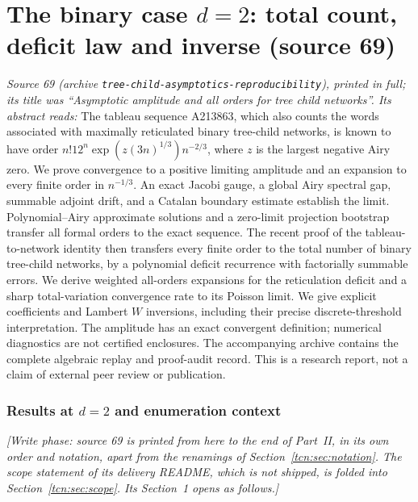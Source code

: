 \documentclass[11pt,letterpaper]{article}
\theoremstyle{remark}
\begin{document}
\part{The binary case \texorpdfstring{$d=2$}{d = 2}: total count, deficit law and inverse (source 69)}\label{tcn:part:b}
\emph{Source 69 (archive \textup{\nolinkurl{tree-child-asymptotics-reproducibility}}), printed in full; its title was ``Asymptotic amplitude and all orders for tree child networks''. Its abstract reads:} The tableau sequence A213863, which also counts the words associated with maximally reticulated binary tree-child networks, is known to have order $n!12^n\exp(z(3n)^{1/3})n^{-2/3}$, where $z$ is the largest negative Airy zero. We prove convergence to a positive limiting amplitude and an expansion to every finite order in $n^{-1/3}$. An exact Jacobi gauge, a global Airy spectral gap, summable adjoint drift, and a Catalan boundary estimate establish the limit. Polynomial--Airy approximate solutions and a zero-limit projection bootstrap transfer all formal orders to the exact sequence. The recent proof of the tableau-to-network identity then transfers every finite order to the total number of binary tree-child networks, by a polynomial deficit recurrence with factorially summable errors. We derive weighted all-orders expansions for the reticulation deficit and a sharp total-variation convergence rate to its Poisson limit. We give explicit coefficients and Lambert $W$ inversions, including their precise discrete-threshold interpretation. The amplitude has an exact convergent definition; numerical diagnostics are not certified enclosures. The accompanying archive contains the complete algebraic replay and proof-audit record. This is a research report, not a claim of external peer review or publication.

\section{Results at \texorpdfstring{$d=2$}{d = 2} and enumeration context}\label{tcn:b:sec:results}
\emph{[Write phase: source 69 is printed from here to the end of Part~II, in its own order and notation, apart from the renamings of Section~\ref{tcn:sec:notation}. The scope statement of its delivery README, which is not shipped, is folded into Section~\ref{tcn:sec:scope}. Its Section~1 opens as follows.]}
\end{document}
